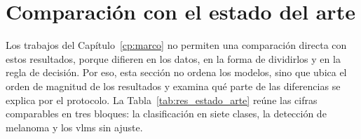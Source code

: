 \section{Comparación con el estado del arte}
\label{sec:res_estado_arte}

Los trabajos del Capítulo~\ref{cp:marco} no permiten una comparación directa con estos resultados, porque difieren en
los datos, en la forma de dividirlos y en la regla de decisión. Por eso, esta sección no ordena los modelos, sino que
ubica el orden de magnitud de los resultados y examina qué parte de las diferencias se explica por el protocolo. La
Tabla~\ref{tab:res_estado_arte} reúne las cifras comparables en tres bloques: la clasificación en siete clases, la
detección de melanoma y los \glspl{vlm} sin ajuste.

